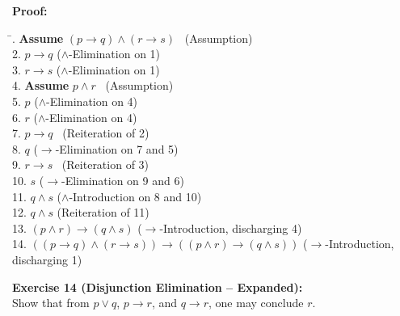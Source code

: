 \documentclass[12pt]{article}
\begin{document}
\textbf{Proof:}
\begin{tabbing}
\hspace*{2cm}\= . \quad \textbf{Assume } \((p\to q)\land (r\to s)\) \quad \ (Assumption)\\[0.5em]
2. \quad \(p\to q\) \quad \quad \quad (\(\land\)-Elimination on 1)\\[0.5em]
3. \quad \(r\to s\) \quad \quad \quad (\(\land\)-Elimination on 1)\\[0.5em]
4. \quad \textbf{Assume } \(p\land r\) \quad \quad \ (Assumption)\\[0.5em]
5. \quad \(p\) \quad \quad \quad (\(\land\)-Elimination on 4)\\[0.5em]
6. \quad \(r\) \quad \quad \quad (\(\land\)-Elimination on 4)\\[0.5em]
7. \quad \(p\to q\) \quad \quad \ (Reiteration of 2)\\[0.5em]
8. \quad \(q\) \quad \quad \quad (\(\to\)-Elimination on 7 and 5)\\[0.5em]
9. \quad \(r\to s\) \quad \quad \ (Reiteration of 3)\\[0.5em]
10. \quad \(s\) \quad \quad \quad (\(\to\)-Elimination on 9 and 6)\\[0.5em]
11. \quad \(q\land s\) \quad \quad (\(\land\)-Introduction on 8 and 10)\\[0.5em]
12. \quad \(q\land s\) \quad \quad (Reiteration of 11)\\[0.5em]
13. \quad \((p\land r)\to (q\land s)\) \quad (\(\to\)-Introduction, discharging 4)\\[0.5em]
14. \quad \(((p\to q)\land (r\to s))\to ((p\land r)\to (q\land s))\) \quad (\(\to\)-Introduction, discharging 1)
\end{tabbing}

\bigskip
\textbf{Exercise 14 (Disjunction Elimination – Expanded):}\\[0.3em]
Show that from \(p\lor q\), \(p\to r\), and \(q\to r\), one may conclude \(r\).
\end{document}
